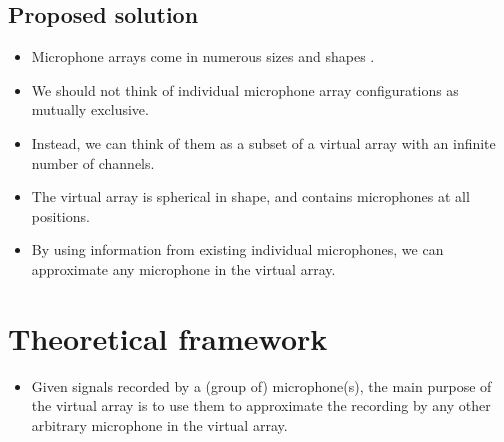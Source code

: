 \documentclass[14pt]{extarticle}
\begin{document}
\subsection{Proposed solution}

\begin{itemize}

\item Microphone arrays come in numerous sizes and shapes \cite{kurz2015comparison, bates2017comparing, lopez2019sphear}. 

\item We should not think of individual microphone array configurations as mutually exclusive.

\item Instead, we can think of them as a subset of a virtual array with an infinite number of channels.

\item The virtual array is spherical in shape, and contains microphones at all positions. 

\item By using information from existing individual microphones, we can approximate any microphone in the virtual array.

\end{itemize}

\section{Theoretical framework}

\begin{itemize}

\item Given signals recorded by a (group of) microphone(s), the main purpose of the virtual array is to use them to approximate the recording by any other arbitrary microphone in the virtual array. 

\end{itemize}
\end{document}
